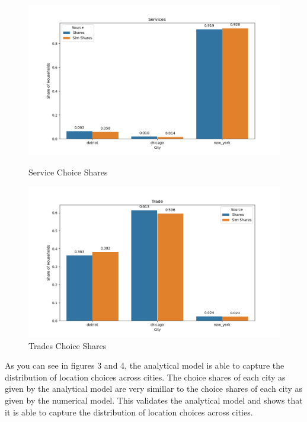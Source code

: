 \documentclass[10pt]{article}
\begin{document}
\begin{figure}
    \begin{minipage}{0.5\textwidth}
        \centering
        \includegraphics[width=\textwidth]{../simulations/graphs/sim_services.png}
        \caption{Service Choice Shares}
        \label{sim_services}
    \end{minipage}
    \begin{minipage}{0.5\textwidth}
        \centering
        \includegraphics[width=\textwidth]{../simulations/graphs/sim_trade.png}
        \caption{Trades Choice Shares}
        \label{sim_trades}
    \end{minipage}
\end{figure}

As you can see in figures 3 and 4, the analytical model is able to capture the distribution of location choices across cities. The choice shares of each city as given by the analytical model are very simillar to the choice shares of each city as given by the numerical model. This validates the analytical model and shows that it is able to capture the distribution of location choices across cities.
\end{document}

